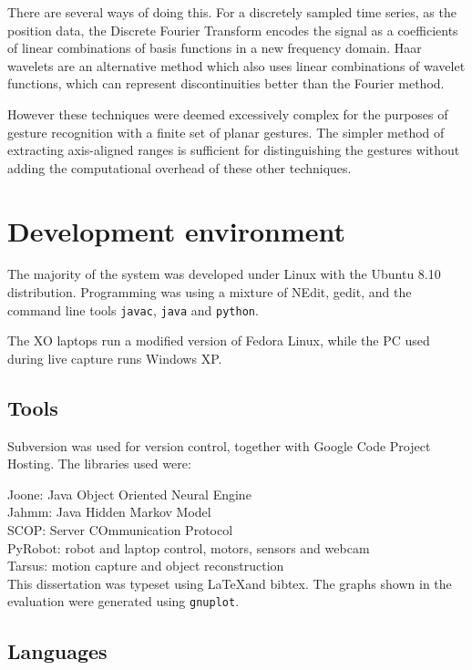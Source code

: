 \documentclass[12pt,a4,notitlepage]{report}
\renewcommand{\_}{\texttt{\symbol{95}}}
\newcommand{\<}{\texttt{\symbol{60}}}
\renewcommand{\>}{\texttt{\symbol{62}}}
\begin{document}
There are several ways of doing this. For a discretely sampled time series, as the position data, the Discrete Fourier Transform encodes the signal as a coefficients of linear combinations of basis functions in a new frequency domain. Haar wavelets are an alternative method which also uses linear combinations of wavelet functions, which can represent discontinuities better than the Fourier method.

However these techniques were deemed excessively complex for the purposes of gesture recognition with a finite set of planar gestures. The simpler method of extracting axis-aligned ranges is sufficient for distinguishing the gestures without adding the computational overhead of these other techniques.

\section{Development environment}

The majority of the system was developed under Linux with the Ubuntu 8.10 distribution. Programming was using a mixture of NEdit, gedit, and the command line tools \texttt{javac}, \texttt{java} and \texttt{python}.

The XO laptops run a modified version of Fedora Linux, while the PC used during live capture runs Windows XP.

\subsection{Tools}

Subversion was used for version control, together with Google Code Project Hosting. The libraries used were:

Joone: Java Object Oriented Neural Engine \\
Jahmm: Java Hidden Markov Model \\
SCOP: Server COmmunication Protocol \\
PyRobot: robot and laptop control, motors, sensors and webcam \\
Tarsus: motion capture and object reconstruction \\

This dissertation was typeset using \LaTeX and bibtex. The graphs shown in the evaluation were generated using \texttt{gnuplot}.

\subsection{Languages}
\end{document}
